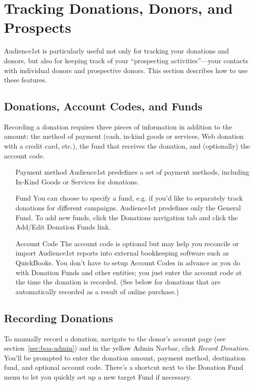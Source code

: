 
\section{Tracking Donations, Donors, and Prospects}
\label{sec:donor}

Audience1st is particularly useful not only for tracking your donations
and donors, but also for keeping track of your ``prospecting
activities''---your contacts with individual donors and prospective
donors.  This section describes how to use these features.

\subsection{Donations, Account Codes, and Funds}
\label{sec:donations}

Recording a donation requires three pieces of information in addition to
the amount: 
the method of payment (cash, in-kind goods or services, Web donation
with a credit card, etc.), the fund that receives the donation, and
(optionally) the account code.

\begin{itemize}
\item[Payment method] Audience1st predefines a set of payment methods,
  including In-Kind Goods or Services for donations.
\item[Fund] You can choose to specify a fund, e.g. if you'd like to
  separately track donations for different campaigns.  Audience1st
  predefines only the General Fund.  To add new funds, click the
  Donations navigation tab and click the Add/Edit Donation Funds link. 
\item[Account Code] The account code is optional but may help you 
  reconcile or import Audience1st reports into external bookkeeping
  software such as QuickBooks.  You don't have to setup Account Codes in
  advance as you do with Donation Funds and other entities; you just
  enter the account code at the time the donation is recorded.  (See
  below for donations that are automatically recorded as a result of
  online purchase.)
\end{itemize}

\subsection{Recording Donations}
\label{sec:recording_donations}

To manually record a donation, navigate to the donor's account page (see
section~\ref{sec:boa-admin}) and in the yellow Admin Navbar, click
\emph{Record Donation}.  You'll be prompted to enter the donation
amount, payment method, destination fund, and optional account code.
There's a shortcut next to the Donation Fund menu to let you quickly set
up a new target Fund if necessary. 


